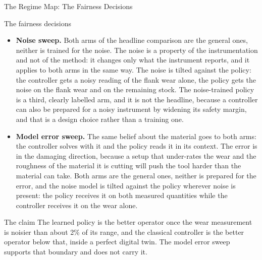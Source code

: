 \documentclass[11pt,aspectratio=169]{beamer}
\begin{document}
\begin{frame}{The Regime Map: The Fairness Decisions}
    \scriptsize
    \begin{block}{The fairness decisions}
    \begin{itemize}
        \item \textbf{Noise sweep.} Both arms of the headline comparison are the general ones, neither
        is trained for the noise. The noise is a property of the instrumentation and not of the
        method: it changes only what the instrument reports, and it applies to both arms in the same
        way. The noise is tilted against the policy: the controller gets a noisy reading of the flank
        wear alone, the policy gets the noise on the flank wear and on the remaining stock. The
        noise-trained policy is a third, clearly labelled arm, and it is not the headline, because a
        controller can also be prepared for a noisy instrument by widening its safety margin, and that
        is a design choice rather than a training one.
        \item \textbf{Model error sweep.} The same belief about the material goes to both arms: the
        controller solves with it and the policy reads it in its context. The error is in the damaging
        direction, because a setup that under-rates the wear and the roughness of the material it is
        cutting will push the tool harder than the material can take. Both arms are the general ones,
        neither is prepared for the error, and the noise model is tilted against the policy wherever
        noise is present: the policy receives it on both measured quantities while the controller
        receives it on the wear alone.
    \end{itemize}
    \end{block}

    \vspace{0.1em}
    \begin{alertblock}{The claim}
    The learned policy is the better operator once the wear measurement is noisier than about 2\% of
    its range, and the classical controller is the better operator below that, inside a perfect
    digital twin. The model error sweep supports that boundary and does not carry it.
    \end{alertblock}
\end{frame}
\end{document}
